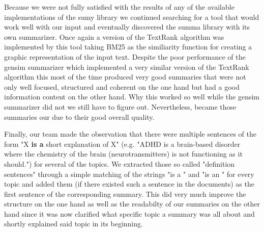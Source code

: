 Because we were not fully satisfied with the results of any of the available implementations of the sumy library we continued searching for a tool that would work well with our input and eventually discovered the summa library with its own summarizer. Once again a version of the TextRank algorithm was implemented by this tool taking BM25 as the similiarity function for creating a graphic representation of the input text. Despite the poor performance of the gensim summarizer which implemented a very similar version of the TextRank algorithm this most of the time produced very good summaries that were not only well focused, structured and coherent on the one hand but had a good information content on the other hand. Why this worked so well while the gensim summarizer did not we still have to figure out. Nevertheless, became those summaries our  due to their good overall quality.  
 
Finally, our team made the observation that there were multiple sentences of the form "X \textbf{is a} short explanation of X" (e.g. "ADHD is a brain-based disorder where the chemistry of the brain (neurotransmitters) is not functioning as it should.") for several of the topics. We extracted those so called "definition sentences" through a simple matching of the strings "is a " and "is an " for every topic and added them (if there existed such a sentence in the documents) as the first sentence of the corresponding summary. This did very much improve the structure on the one hand as well as the readabilty of our summaries on the other hand since it was now clarified what specific topic a summary was all about and shortly explained said topic in its beginning.
